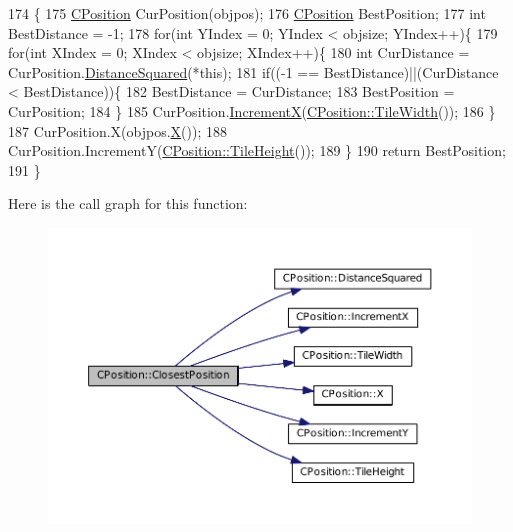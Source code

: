 \begin{DoxyCode}
174                                                                               \{
175     \hyperlink{classCPosition}{CPosition} CurPosition(objpos);
176     \hyperlink{classCPosition}{CPosition} BestPosition;
177     \textcolor{keywordtype}{int} BestDistance = -1;
178     \textcolor{keywordflow}{for}(\textcolor{keywordtype}{int} YIndex = 0; YIndex < objsize; YIndex++)\{
179         \textcolor{keywordflow}{for}(\textcolor{keywordtype}{int} XIndex = 0; XIndex < objsize; XIndex++)\{
180             \textcolor{keywordtype}{int} CurDistance = CurPosition.\hyperlink{classCPosition_acd96d507f44c0fdf13036ebc1a09e59c}{DistanceSquared}(*\textcolor{keyword}{this});
181             \textcolor{keywordflow}{if}((-1 == BestDistance)||(CurDistance < BestDistance))\{
182                 BestDistance = CurDistance;
183                 BestPosition = CurPosition;
184             \}
185             CurPosition.\hyperlink{classCPosition_aa5955d67d5ab7ca74d80cb7303b6eaa9}{IncrementX}(\hyperlink{classCPosition_a27a7a8b9a5541da0aa8d97d785650fb8}{CPosition::TileWidth}());
186         \}
187         CurPosition.X(objpos.\hyperlink{classCPosition_a9a6b94d3b91df1492d166d9964c865fc}{X}());
188         CurPosition.IncrementY(\hyperlink{classCPosition_ac4f0edd9c9632f1bdca981ef5d9b71e5}{CPosition::TileHeight}());
189     \}
190     \textcolor{keywordflow}{return} BestPosition;
191 \}
\end{DoxyCode}
Here is the call graph for this function\+:
\nopagebreak
\begin{figure}[H]
\begin{center}
\leavevmode
\includegraphics[width=350pt]{classCPosition_a91fd43eeb2c894bcb7577ae87247b726_cgraph}
\end{center}
\end{figure}
